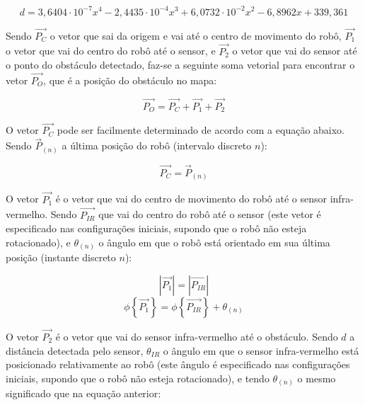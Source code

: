 \begin{equation}
  d = 3,6404 \cdot 10^{-7} x^4 - 2,4435 \cdot 10^{-4} x^3 + 6,0732 \cdot 10^{-2} x^2 - 6,8962 x + 339,361
  \label{eq:IR_dist}
\end{equation}


Sendo $\overrightarrow{P_C}$ o vetor que sai da origem e vai até o centro de movimento do robô, $\overrightarrow{P_1}$ o vetor que vai do centro do robô até o sensor, e $\overrightarrow{P_2}$ o vetor que vai do sensor até o ponto do obstáculo detectado, faz-se a seguinte soma vetorial para encontrar o vetor $\overrightarrow{P_O}$, que é a posição do obstáculo no mapa:

\begin{equation}
  \overrightarrow{P_O} = \overrightarrow{P_C} + \overrightarrow{P_1} + \overrightarrow{P_2}
  \label{eq:IR_vector}
\end{equation}


O vetor $\overrightarrow{P_C}$ pode ser facilmente determinado de acordo com a equação abaixo. Sendo $\overrightarrow{P}_{(n)}$ a última posição do robô (intervalo discreto $n$):

\begin{equation}
  \overrightarrow{P_C} = \overrightarrow{P}_{(n)}
  \label{eq:IR-P_C}
\end{equation}

O vetor $\overrightarrow{P_1}$ é o vetor que vai do centro de movimento do robô até o sensor infra-vermelho. Sendo $\overrightarrow{P_{IR}}$ que vai do centro do robô até o sensor (este vetor é especificado nas configurações iniciais, supondo que o robô não esteja rotacionado), e $\theta_{(n)}$ o ângulo em que o robô está orientado em sua última posição (instante discreto $n$):


\begin{equation}
  |\overrightarrow{P_1}| = |\overrightarrow{P_{IR}}|
  \label{eq:IR-P_1_modulo}
\end{equation}
\begin{equation}
  \phi \left\{ \overrightarrow{P_1} \right\} = \phi \left\{ \overrightarrow{P_{IR}} \right\} + \theta_{(n)}
  \label{eq:IR-P_1_fase}
\end{equation}


O vetor $\overrightarrow{P_2}$ é o vetor que vai do sensor infra-vermelho até o obstáculo. Sendo $d$ a distância detectada pelo sensor, $\theta_{IR}$ o ângulo em que o sensor infra-vermelho está posicionado relativamente ao robô (este ângulo é especificado nas configurações iniciais, supondo que o robô não esteja rotacionado), e tendo $\theta_{(n)}$ o mesmo significado que na equação anterior:

